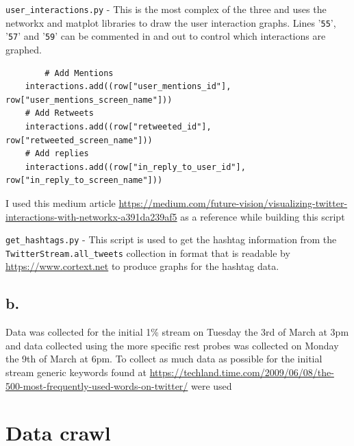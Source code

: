 \documentclass[10pt,a4paper]{article}
\begin{document}
	\verb|user_interactions.py| - This is the most complex of the three and uses the networkx and matplot libraries to draw the user interaction graphs. Lines '\verb|55|', '\verb|57|' and '\verb|59|' can be commented in and out to control which interactions are graphed.
	\begin{verbatim}
	    # Add Mentions
    interactions.add((row["user_mentions_id"], row["user_mentions_screen_name"]))
    # Add Retweets
    interactions.add((row["retweeted_id"], row["retweeted_screen_name"]))
    # Add replies
    interactions.add((row["in_reply_to_user_id"], row["in_reply_to_screen_name"]))
	\end{verbatim}
	I used this medium article \url{https://medium.com/future-vision/visualizing-twitter-interactions-with-networkx-a391da239af5} as a reference while building this script
	
	\verb|get_hashtags.py| - This script is used to get the hashtag information from the \verb|TwitterStream.all_tweets| collection in format that is readable by \url{https://www.cortext.net} to produce graphs for the hashtag data.
	
	
\subsection*{b. } 
Data was collected for the initial 1\% stream on Tuesday the 3rd of March at 3pm and data collected using the more specific rest probes was collected on Monday the 9th of March at 6pm. To collect as much data as possible for the initial stream generic keywords found at \url{https://techland.time.com/2009/06/08/the-500-most-frequently-used-words-on-twitter/} were used 

\section{Data crawl}
\end{document}
